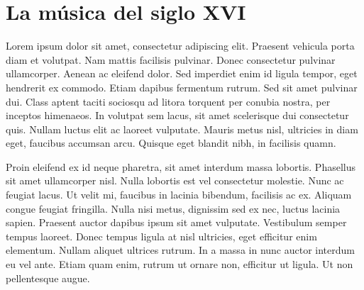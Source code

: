 

\section{La música del siglo XVI}

Lorem ipsum dolor sit amet, consectetur adipiscing elit. Praesent
vehicula porta diam et volutpat. Nam mattis facilisis pulvinar. Donec
consectetur pulvinar ullamcorper. Aenean ac eleifend dolor. Sed
imperdiet enim id ligula tempor, eget hendrerit ex commodo. Etiam
dapibus fermentum rutrum. Sed sit amet pulvinar dui. Class aptent taciti
sociosqu ad litora torquent per conubia nostra, per inceptos himenaeos.
In volutpat sem lacus, sit amet scelerisque dui consectetur quis. Nullam
luctus elit ac laoreet vulputate. Mauris metus nisl, ultricies in diam
eget, faucibus accumsan arcu. Quisque eget blandit nibh, in facilisis
quamn.

Proin eleifend ex id neque pharetra, sit amet interdum massa lobortis.
Phasellus sit amet ullamcorper nisl. Nulla lobortis est vel consectetur
molestie. Nunc ac feugiat lacus. Ut velit mi, faucibus in lacinia
bibendum, facilisis ac ex. Aliquam congue feugiat fringilla. Nulla nisi
metus, dignissim sed ex nec, luctus lacinia sapien. Praesent auctor
dapibus ipsum sit amet vulputate. Vestibulum semper tempus laoreet.
Donec tempus ligula at nisl ultricies, eget efficitur enim elementum.
Nullam aliquet ultrices rutrum. In a massa in nunc auctor interdum eu
vel ante. Etiam quam enim, rutrum ut ornare non, efficitur ut ligula. Ut
non pellentesque augue.
